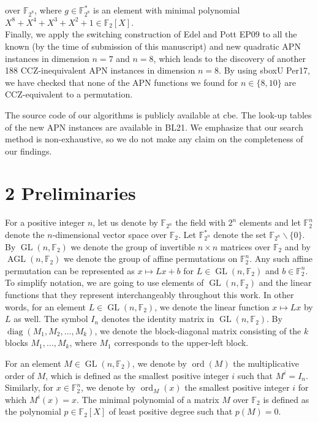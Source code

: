 \documentclass[10pt]{article}
\begin{document}
over $\mathbb{F}_{2^{8}}$, where $g \in \mathbb{F}_{2^{8}}^{*}$ is an element with minimal polynomial $X^{8}+X^{4}+X^{3}+X^{2}+1 \in \mathbb{F}_{2}[X]$.\\
Finally, we apply the switching construction of Edel and Pott EP09 to all the known (by the time of submission of this manuscript) and new quadratic APN instances in dimension $n=7$ and $n=8$, which leads to the discovery of another 188 CCZ-inequivalent APN instances in dimension $n=8$. By using sboxU Per17, we have checked that none of the APN functions we found for $n \in\{8,10\}$ are CCZ-equivalent to a permutation.

The source code of our algorithms is publicly available at cbe. The look-up tables of the new APN instances are available in BL21. We emphasize that our search method is non-exhaustive, so we do not make any claim on the completeness of our findings.

\section*{2 Preliminaries}
For a positive integer $n$, let us denote by $\mathbb{F}_{2^{n}}$ the field with $2^{n}$ elements and let $\mathbb{F}_{2}^{n}$ denote the $n$-dimensional vector space over $\mathbb{F}_{2}$. Let $\mathbb{F}_{2^{n}}^{*}$ denote the set $\mathbb{F}_{2^{n}} \backslash\{0\}$. By $\operatorname{GL}\left(n, \mathbb{F}_{2}\right)$ we denote the group of invertible $n \times n$ matrices over $\mathbb{F}_{2}$ and by $\operatorname{AGL}\left(n, \mathbb{F}_{2}\right)$ we denote the group of affine permutations on $\mathbb{F}_{2}^{n}$. Any such affine permutation can be represented as $x \mapsto L x+b$ for $L \in \operatorname{GL}\left(n, \mathbb{F}_{2}\right)$ and $b \in \mathbb{F}_{2}^{n}$. To simplify notation, we are going to use elements of $\operatorname{GL}\left(n, \mathbb{F}_{2}\right)$ and the linear functions that they represent interchangeably throughout this work. In other words, for an element $L \in \operatorname{GL}\left(n, \mathbb{F}_{2}\right)$, we denote the linear function $x \mapsto L x$ by $L$ as well. The symbol $I_{n}$ denotes the identity matrix in $\operatorname{GL}\left(n, \mathbb{F}_{2}\right)$. By $\operatorname{diag}\left(M_{1}, M_{2}, \ldots, M_{k}\right)$, we denote the block-diagonal matrix consisting of the $k$ blocks $M_{1}, \ldots, M_{k}$, where $M_{1}$ corresponds to the upper-left block.

For an element $M \in \operatorname{GL}\left(n, \mathbb{F}_{2}\right)$, we denote by $\operatorname{ord}(M)$ the multiplicative order of $M$, which is defined as the smallest positive integer $i$ such that $M^{i}=I_{n}$. Similarly, for $x \in \mathbb{F}_{2}^{n}$, we denote by $\operatorname{ord}_{M}(x)$ the smallest positive integer $i$ for which $M^{i}(x)=x$. The minimal polynomial of a matrix $M$ over $\mathbb{F}_{2}$ is defined as the polynomial $p \in \mathbb{F}_{2}[X]$ of least positive degree such that $p(M)=0$.
\end{document}
